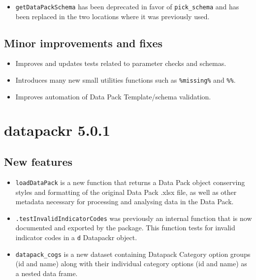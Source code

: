 \documentclass[
  openany]{book}
\providecommand{\tightlist}{%
  \setlength{\itemsep}{0pt}\setlength{\parskip}{0pt}}
\begin{document}
\begin{itemize}
\tightlist
\item
  \texttt{getDataPackSchema} has been deprecated in favor of \texttt{pick\_schema} and has been
  replaced in the two locations where it was previously used.
\end{itemize}

\hypertarget{minor-improvements-and-fixes-1}{%
\subsection{Minor improvements and fixes}\label{minor-improvements-and-fixes-1}}

\begin{itemize}
\tightlist
\item
  Improves and updates tests related to parameter checks and schemas.
\item
  Introduces many new small utilities functions such as \texttt{\%missing\%} and \texttt{\%\textbar{}\textbar{}\%}.
\item
  Improves automation of Data Pack Template/schema validation.
\end{itemize}

\hypertarget{datapackr-5.0.1}{%
\section{datapackr 5.0.1}\label{datapackr-5.0.1}}

\hypertarget{new-features-2}{%
\subsection{New features}\label{new-features-2}}

\begin{itemize}
\tightlist
\item
  \texttt{loadDataPack} is a new function that returns a Data Pack object conserving
  styles and formatting of the original Data Pack .xlsx file, as well as other
  metadata necessary for processing and analysing data in the Data Pack.
\item
  \texttt{.testInvalidIndicatorCodes} was previously an internal function that is now
  documented and exported by the package. This function tests for invalid
  indicator codes in a \texttt{d} Datapackr object.
\item
  \texttt{datapack\_cogs} is a new dataset containing Datapack Category option groups
  (id and name) along with their individual category options (id and name) as a
  nested data frame.
\end{itemize}
\end{document}
